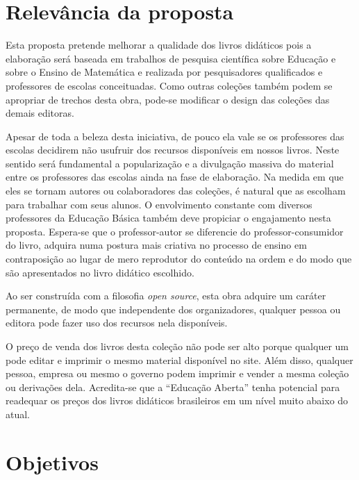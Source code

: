 \documentclass[10 pt]{article}
\begin{document}
\section{Relevância da proposta}

Esta proposta pretende melhorar a qualidade dos livros didáticos pois a elaboração será baseada em trabalhos de pesquisa científica sobre Educação e sobre o Ensino de Matemática e realizada por pesquisadores qualificados e professores de escolas conceituadas. 
Como outras coleções também podem se apropriar de trechos desta obra, pode-se modificar o design das coleções das demais editoras.

Apesar de toda a beleza desta iniciativa, de pouco ela vale se os professores das escolas decidirem não usufruir dos recursos disponíveis em nossos livros.
Neste sentido será fundamental a popularização e a divulgação massiva do material entre os professores das escolas ainda na fase de elaboração.
Na medida em que eles se tornam autores ou colaboradores das coleções, é natural que as escolham para trabalhar com seus alunos.
O envolvimento constante com diversos professores da Educação Básica também deve propiciar o engajamento nesta proposta.
Espera-se que o professor-autor se diferencie do professor-consumidor do livro, adquira numa postura mais criativa no processo de ensino em contraposição ao lugar de mero reprodutor do conteúdo na ordem e do modo que são apresentados no livro didático escolhido.

Ao ser construída com a filosofia {\it open source}, esta obra adquire um caráter permanente, de modo que independente dos organizadores, qualquer pessoa ou editora pode fazer uso dos recursos nela disponíveis. 

O preço de venda dos livros desta coleção não pode ser alto porque qualquer um pode editar e imprimir o mesmo material disponível no site.
Além disso, qualquer pessoa, empresa ou mesmo o governo podem imprimir e vender a mesma coleção ou derivações dela.
Acredita-se que a ``Educação Aberta'' tenha potencial para readequar os preços dos livros didáticos brasileiros em um nível muito abaixo do atual.

\section{Objetivos}
\end{document}
